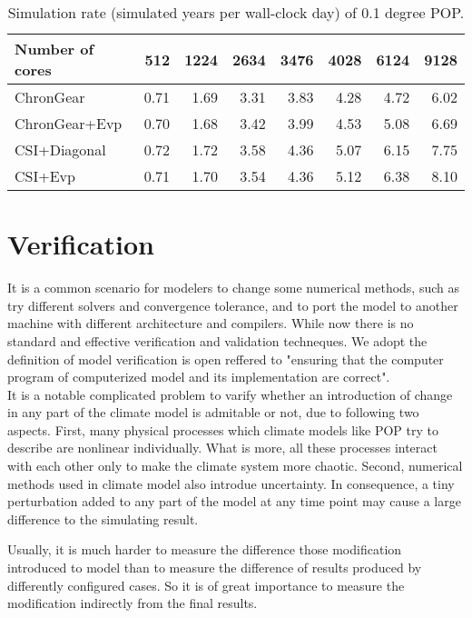 \documentclass{sig-alternate}
\begin{document}
\begin{table*}
\centering
\caption {Simulation rate (simulated years per wall-clock day) of 0.1 degree POP.  \label{tab:improve_01}}
\begin{tabular}{|l|r|r|r|r|r|r|r|}
\hline
Number of cores & 512  & 1224   & 2634 & 3476 & 4028 & 6124 & 9128\\
\hline
ChronGear     &0.71 &1.69&3.31  &3.83 &4.28 &4.72&6.02\\\hline
ChronGear+Evp &0.70 &1.68&3.42  &3.99 &4.53 &5.08&6.69\\\hline
CSI+Diagonal  &0.72 &1.72&3.58  &4.36 &5.07 &6.15&7.75\\\hline
CSI+Evp	      &0.71 &1.70&3.54  &4.36 &5.12 &6.38&8.10\\
\hline
\end{tabular}
\end{table*}



\section{Verification} \label{se:ver}

It is a common scenario for modelers to change some numerical methods, such as try different solvers and convergence tolerance, and to port the model to another machine with different architecture and compilers. While now there is no standard and effective verification and validation techneques.  
We adopt the definition of model verification is open reffered to "ensuring that the computer program of computerized model and its implementation are correct". \\

It is a notable complicated problem to varify whether an introduction of change in any part of the climate model is admitable or not, due to following two aspects. First, many physical processes which climate models like POP try to describe are nonlinear individually. What is more, all these processes interact with each other only to make the climate system more chaotic. Second, numerical methods used in climate model also introdue uncertainty. In consequence, a tiny perturbation added to any part of the model at any time point may cause a large difference to the simulating result.   

Usually, it is much harder to measure the difference those modification introduced to model than to measure the difference of results produced by differently configured cases. So it is of great importance to measure the modification indirectly from the final results. 
\end{document}
